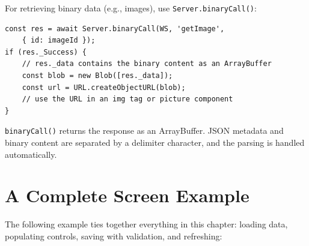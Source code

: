 For retrieving binary data (e.g., images), use \texttt{Server.binaryCall()}:

\begin{lstlisting}[style=javascript]
const res = await Server.binaryCall(WS, 'getImage',
    { id: imageId });
if (res._Success) {
    // res._data contains the binary content as an ArrayBuffer
    const blob = new Blob([res._data]);
    const url = URL.createObjectURL(blob);
    // use the URL in an img tag or picture component
}
\end{lstlisting}

\noindent
\texttt{binaryCall()} returns the response as an ArrayBuffer.  JSON metadata and binary content are separated by a delimiter character, and the parsing is handled automatically.

\section{A Complete Screen Example}
\label{sec:sc-complete-example}

The following example ties together everything in this chapter: loading data, populating controls, saving with validation, and refreshing:

